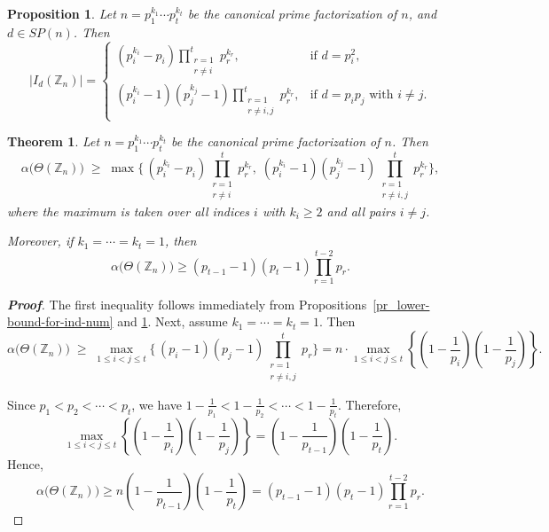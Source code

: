 \documentclass[10pt,a4paper]{amsart}
\newtheorem{proposition}{Proposition}
\newtheorem{theorem}{Theorem}
\begin{document}
\begin{proposition}\label{pr_explicit-formula-size-Id}
Let $n= p_1^{k_1}\cdots p_t^{k_t}$ be the canonical prime factorization of $n$, and $d\in SP(n)$. Then 
\[
|I_d(\mathbb{Z}_n)| =
\begin{cases}
	(p_i^{k_i} - p_i)\displaystyle\prod_{\substack{r=1 \\ r\neq i}}^{t} p_r^{k_r}, & \text{if $d = p_i^2$}, \\[0.5em]
	(p_i^{k_i} - 1)(p_j^{k_j} - 1)\displaystyle\prod_{\substack{r=1 \\ r\neq i,j}}^{t} p_r^{k_r}, & \text{if $d = p_i p_j$ with $i \neq j$}.
\end{cases}\]
\end{proposition}

\begin{theorem}\label{th_ind-num-cyclic-group}
Let $n= p_1^{k_1}\cdots p_t^{k_t}$ be the canonical prime factorization of $n$. Then
\[
	\alpha\bigl(\Theta(\mathbb{Z}_n)\bigr) \;\geq\; \max\Biggl\{
	\,(p_i^{k_i} - p_i)   \prod_{\substack{r=1\\ r\neq i}}^t p_r^{k_r},\;
	(p_i^{k_i} - 1)(p_j^{k_j} - 1)\prod_{\substack{r=1\\r\neq i,j}}^t p_r^{k_r}
	\Biggr\},\]
	where the maximum is taken over all indices $i$ with $k_i \geq 2$ and all pairs $i \neq j$.

\vspace{0.2mm}
Moreover, if $k_1 = \cdots = k_t = 1$, then \[\alpha\!\bigl(\Theta(\mathbb{Z}_{n})\bigr)
\geq (p_{t-1}-1)(p_t-1) \prod_{r=1}^{t-2} p_r.\]
\end{theorem}

\begin{proof}[\textbf{Proof}]
The first inequality follows immediately from  Propositions~\ref{pr_lower-bound-for-ind-num} and \ref{pr_explicit-formula-size-Id}. Next, assume $k_1 = \cdots = k_t = 1$. Then  \[
\alpha\bigl(\Theta(\mathbb{Z}_n)\bigr) \;\geq\; \max_{1\leq i < j\leq t}\biggl\{
\,(p_i - 1)(p_j - 1)\prod_{\substack{r=1\\ r\neq i,j}}^t p_r
\biggr\} = n\cdot \max_{1\leq i < j\leq t}\left\{\left(1- \frac{1}{p_i}\right) \left(1- \frac{1}{p_j}\right)\right\}.\]


Since $p_1 < p_2 < \cdots < p_t$, we have $1-\frac{1}{p_1} <  1-\frac{1}{p_2}< \cdots <1-\frac{1}{p_t}$. Therefore,  
\[\max_{1\leq i< j\leq t}\left\{ \left(1- \frac{1}{p_i}\right) \left(1- \frac{1}{p_j}\right)\right\} =  \left(1- \frac{1}{p_{t-1}}\right) \left(1- \frac{1}{p_t}\right).\] Hence, 
\[\alpha\bigl(\Theta(\mathbb{Z}_n)\bigr) \geq  n \left(1- \frac{1}{p_{t-1}}\right) \left(1- \frac{1}{p_t}\right)
= (p_{t-1}-1)(p_t-1) \prod_{r=1}^{t-2} p_r.\]
\end{proof}
\end{document}
